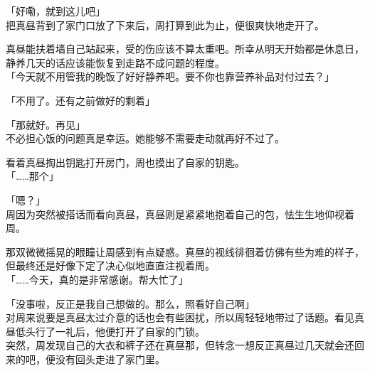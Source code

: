 「好嘞，就到这儿吧」\\

把真昼背到了家门口放了下来后，周打算到此为止，便很爽快地走开了。

真昼能扶着墙自己站起来，受的伤应该不算太重吧。所幸从明天开始都是休息日，静养几天的话应该能恢复到走路不成问题的程度。\\

「今天就不用管我的晚饭了好好静养吧。要不你也靠营养补品对付过去？」

「不用了。还有之前做好的剩着」

「那就好。再见」\\

不必担心饭的问题真是幸运。她能够不需要走动就再好不过了。

看着真昼掏出钥匙打开房门，周也摸出了自家的钥匙。\\

「……那个」

「嗯？」\\

周因为突然被搭话而看向真昼，真昼则是紧紧地抱着自己的包，怯生生地仰视着周。

那双微微摇晃的眼瞳让周感到有点疑惑。真昼的视线徘徊着仿佛有些为难的样子，但最终还是好像下定了决心似地直直注视着周。\\

「……今天，真的是非常感谢。帮大忙了」

「没事啦，反正是我自己想做的。那么，照看好自己啊」\\

对周来说要是真昼太过介意的话也会有些困扰，所以周轻轻地带过了话题。看见真昼低头行了一礼后，他便打开了自家的门锁。\\

突然，周发现自己的大衣和裤子还在真昼那，但转念一想反正真昼过几天就会还回来的吧，便没有回头走进了家门里。
